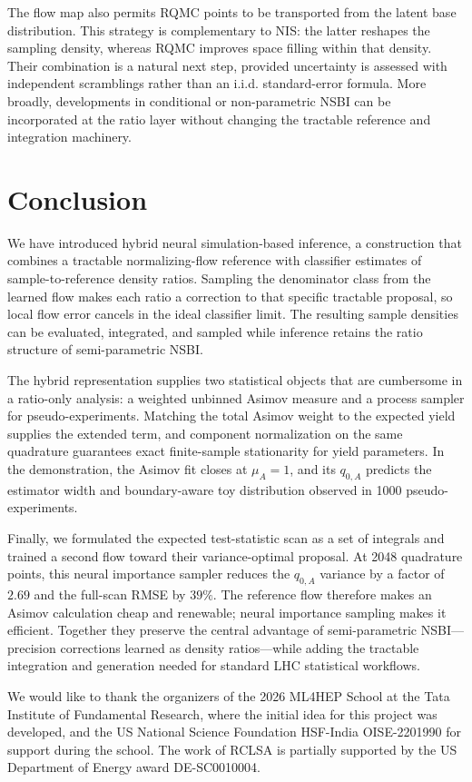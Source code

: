 \documentclass[
  aps,
  prd,
  superscriptaddress,
  nofootinbib,
  longbibliography,
  12pt
]{revtex4-2}
\begin{document}
The flow map also permits RQMC points to be transported from the latent base distribution.  This strategy is complementary to NIS: the latter reshapes the sampling density, whereas RQMC improves space filling within that density.  Their combination is a natural next step, provided uncertainty is assessed with independent scramblings rather than an i.i.d. standard-error formula.  More broadly, developments in conditional or non-parametric NSBI can be incorporated at the ratio layer without changing the tractable reference and integration machinery.

\section{Conclusion}
\label{sec:conclusion}

We have introduced hybrid neural simulation-based inference, a construction that combines a tractable normalizing-flow reference with classifier estimates of sample-to-reference density ratios.  Sampling the denominator class from the learned flow makes each ratio a correction to that specific tractable proposal, so local flow error cancels in the ideal classifier limit.  The resulting sample densities can be evaluated, integrated, and sampled while inference retains the ratio structure of semi-parametric NSBI.

The hybrid representation supplies two statistical objects that are cumbersome in a ratio-only analysis: a weighted unbinned Asimov measure and a process sampler for pseudo-experiments.  Matching the total Asimov weight to the expected yield supplies the extended term, and component normalization on the same quadrature guarantees exact finite-sample stationarity for yield parameters.  In the demonstration, the Asimov fit closes at $\mu_A=1$, and its $q_{0,A}$ predicts the estimator width and boundary-aware toy distribution observed in 1000 pseudo-experiments.

Finally, we formulated the expected test-statistic scan as a set of integrals and trained a second flow toward their variance-optimal proposal.  At 2048 quadrature points, this neural importance sampler reduces the $q_{0,A}$ variance by a factor of $2.69$ and the full-scan RMSE by $39\%$.  The reference flow therefore makes an Asimov calculation cheap and renewable; neural importance sampling makes it efficient.  Together they preserve the central advantage of semi-parametric NSBI---precision corrections learned as density ratios---while adding the tractable integration and generation needed for standard LHC statistical workflows.

\begin{acknowledgments}
We would like to thank the organizers of the 2026 ML4HEP School at the Tata Institute of Fundamental Research, where the initial idea for this project was developed, and the US National Science Foundation HSF-India OISE-2201990 for support during the school.  The work of RCLSA is partially supported by the US Department of Energy award DE-SC0010004.
\end{acknowledgments}


\end{document}
